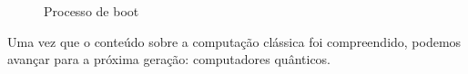 \vspace{1cm}
\begin{figure}[H] \centering 
  \caption{\label{zsig_OS_boot} Processo de boot} 
\end{figure}

Uma vez que o conteúdo sobre a computação clássica foi compreendido, podemos avançar para a próxima geração: computadores quânticos.
\newpage
